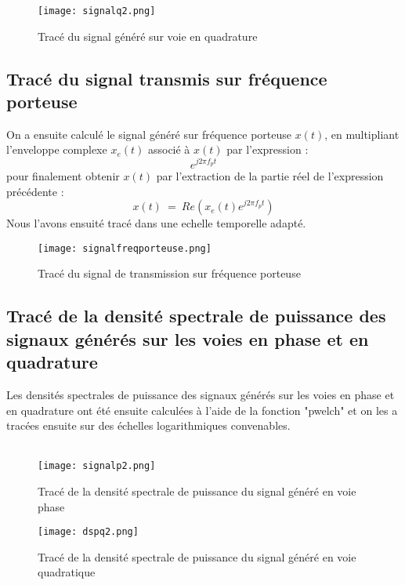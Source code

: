 \documentclass[11pt]{article}
\begin{document}
\begin{figure}[ht!]
    \centering
    \texttt{[image: signalq2.png]}
    \caption{Tracé du signal généré sur voie en quadrature \label{fig : SignalQuadrature}}
\end{figure}

\subsection{Tracé du signal transmis sur fréquence porteuse}
On a ensuite calculé le signal généré sur fréquence porteuse $x(t)$, en multipliant l'enveloppe complexe $x_e(t)$ associé à $x(t)$ par l'expression :
$$e^{j2\pi f_pt}$$
pour finalement obtenir $x(t)$ par l'extraction de la partie réel de l'expression précédente :
$$x(t) \ = \ Re(x_e(t)e^{j2\pi f_pt})$$
Nous l'avons ensuité tracé dans une echelle temporelle adapté.\\

\begin{figure}[ht!]
    \centering
    \texttt{[image: signalfreqporteuse.png]}
    \caption{Tracé du signal de transmission sur fréquence porteuse \label{fig : SignalFreqPorteuse}}
\end{figure}

\newpage
\subsection{Tracé de la densité spectrale de puissance des signaux générés sur les voies en phase et en quadrature}
Les densités spectrales de puissance des signaux générés sur les voies en phase et en quadrature ont été ensuite calculées à l'aide de la fonction "pwelch" et on les a tracées ensuite sur des échelles logarithmiques convenables.\\\\

\begin{figure}[ht!]
    \centering
    \texttt{[image: signalp2.png]}
    \caption{Tracé de la densité spectrale de puissance du signal généré en voie phase  \label{fig : DspPhase}}
\end{figure}

\begin{figure}[ht!]
    \centering
    \texttt{[image: dspq2.png]}
    \caption{Tracé de la densité spectrale de puissance du signal généré en voie quadratique  \label{fig : DspQuadratique}}
\end{figure}
\end{document}
